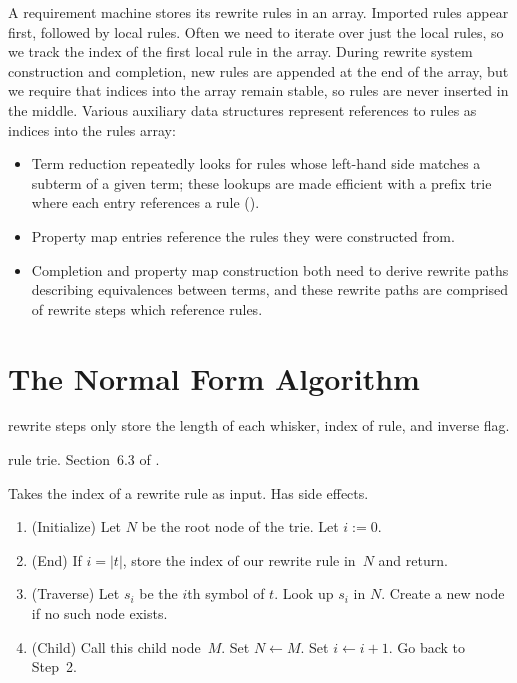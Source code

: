 \documentclass[../generics]{subfiles}
\begin{document}
%
%
A requirement machine stores its rewrite rules in an array. Imported rules appear first, followed by local rules. Often we need to iterate over just the local rules, so we track the index of the first local rule in the array. During rewrite system construction and completion, new rules are appended at the end of the array, but we require that indices into the array remain stable, so rules are never inserted in the middle. Various auxiliary data structures represent references to rules as indices into the rules array:
\begin{itemize}
\item Term reduction repeatedly looks for rules whose left-hand side matches a subterm of a given term; these lookups are made efficient with a prefix trie where each entry references a rule ().
\item Property map entries reference the rules they were constructed from.
\item Completion and property map construction both need to derive rewrite paths describing equivalences between terms, and these rewrite paths are comprised of rewrite steps which reference rules.
\end{itemize}

%
%

\section{The Normal Form Algorithm}\label{term reduction}


rewrite steps only store the length of each whisker, index of rule, and inverse flag.

rule trie. Section~6.3 of \cite{art3}.

\begin{algorithm}\label{trie insert algo}
Takes the index of a rewrite rule as input. Has side effects.
\begin{enumerate}
\item (Initialize) Let $N$ be the root node of the trie. Let $i:=0$.
\item (End) If $i=|t|$, store the index of our rewrite rule in~$N$ and return.
\item (Traverse) Let $s_i$ be the $i$th symbol of $t$. Look up $s_i$ in $N$. Create a new node if no such node exists.
\item (Child) Call this child node~$M$. Set $N \leftarrow M$. Set $i \leftarrow i+1$. Go back to Step~2.
\end{enumerate}
\end{algorithm}
\end{document}
